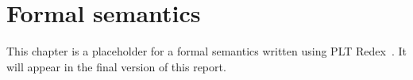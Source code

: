 \chapter{Formal semantics}
\label{formalsemanticschapter}

This chapter is a placeholder for a formal semantics written using PLT
Redex~\cite{PLTRedex,R5RSSemantics}.  It will appear in the final version of this report.

